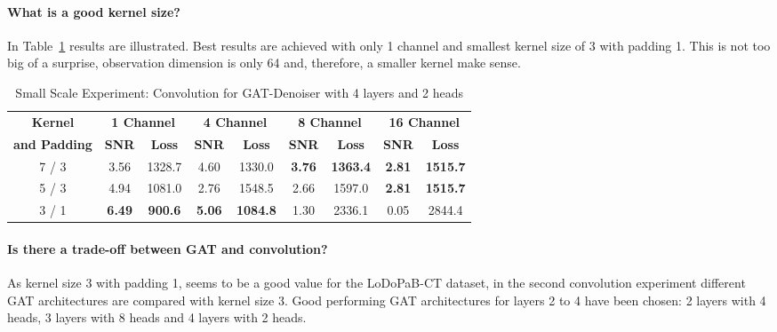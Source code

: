 \paragraph{What is a good kernel size?}

In Table~\ref{tab:small_convolution} results are illustrated. 
Best results are achieved with only 1 channel and smallest kernel size of 3 with padding 1.
This is not too big of a surprise, observation dimension is only 64 and, therefore, a smaller kernel make sense.


\begin{table}[H]
  \centering
  \begin{tabular}{c|cc|cc|cc|cc}
    \toprule
    \textbf{Kernel}  & \multicolumn{2}{c|}{\textbf{1 Channel}} & \multicolumn{2}{c|}{\textbf{4 Channel}} & \multicolumn{2}{c|}{\textbf{8 Channel}} & \multicolumn{2}{c}{\textbf{16 Channel}} \\
    \textbf{and Padding}  & \small \small \textbf{SNR} & \small \textbf{Loss} & \small \small \textbf{SNR} & \small \textbf{Loss} & \small \small \textbf{SNR} & \small \textbf{Loss} & \small \small \textbf{SNR} & \small \textbf{Loss} \\ 
    \midrule
      7 / 3 & 3.56 & 1328.7                  & 4.60  &  1330.0                   & \textbf{3.76} & \textbf{1363.4} & \textbf{2.81}  & \textbf{1515.7} \\ \hline
      5 / 3 & 4.94 & 1081.0                  & 2.76  &  1548.5                   & 2.66 & 1597.0                   & \textbf{2.81}  & \textbf{1515.7} \\ \hline
      3 / 1 & \textbf{6.49} & \textbf{900.6} & \textbf{5.06}  &  \textbf{1084.8} & 1.30 & 2336.1                   & 0.05  & 2844.4 \\

    \midrule
  \end{tabular}

  \caption{Small Scale Experiment: Convolution for GAT-Denoiser with 4 layers and 2 heads}
  \label{tab:small_convolution}
\end{table}

\paragraph{Is there a trade-off between GAT and convolution?}

As kernel size 3 with padding 1, seems to be a good value for the LoDoPaB-CT dataset, 
in the second convolution experiment different GAT architectures are compared with kernel size 3.
Good performing GAT architectures for layers 2 to 4 have been chosen: 2 layers with 4 heads, 3 layers with 8 heads
and 4 layers with 2 heads.

